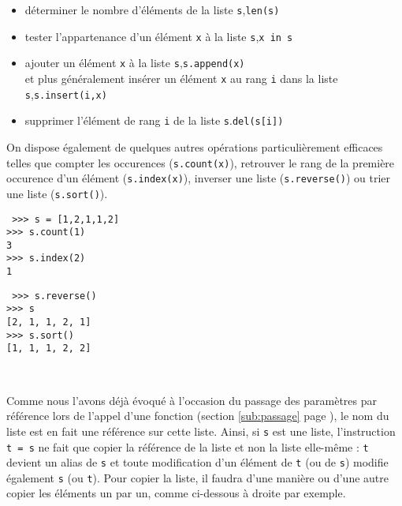 \begin{itemize}
\item déterminer le nombre d'éléments de la liste {\tt s},\hfill{\tt len(s)}
\item tester l'appartenance d'un élément {\tt x} à la liste {\tt s},\hfill{\tt x in s}
\item ajouter un élément {\tt x} à la liste {\tt s},\hfill{\tt s.append(x)}\\
	et plus généralement insérer un élément {\tt x} au rang {\tt i}
	dans la liste {\tt s},\hfill{\tt s.insert(i,x)}
\item supprimer l'élément de rang {\tt i} de la liste {\tt s}.\hfill{\tt del(s[i])}
\end{itemize}

On dispose également de quelques autres opérations particulièrement efficaces telles 
que compter les occurences ({\tt s.count(x)}), retrouver le rang de la première occurence
d'un élément ({\tt s.index(x)}), inverser une liste ({\tt s.reverse()}) ou trier une liste
({\tt s.sort()}).

\noindent\mbox{}\hspace*{1cm}\begin{py}{6.5cm}\tt
>>> s = [1,2,1,1,2]\\
>>> s.count(1)\\
3\\
>>> s.index(2)\\
1
\end{py}
\hfill
\begin{py}{6.5cm}\tt
>>> s.reverse()\\
>>> s\\
\mbox{}[2, 1, 1, 2, 1]\\
>>> s.sort()\\
\mbox{}[1, 1, 1, 2, 2]
\end{py}\\

\vspace*{2mm}

Comme nous l'avons déjà évoqué à l'occasion du passage des paramètres par référence
lors de l'appel d'une fonction (section \ref{sub:passage} page \pageref{sub:passage}), 
le nom du liste est en fait une référence sur cette liste. Ainsi, si {\tt s} est une liste,
l'instruction {\tt t = s} ne fait que copier la référence de la liste et non la liste
elle-même : {\tt t} devient un alias de {\tt s} et toute modification d'un élément de {\tt t}
(ou de {\tt s}) modifie également {\tt s} (ou {\tt t}). 
Pour copier la liste, il faudra d'une 
manière ou d'une autre copier les éléments un par un, comme 
ci-dessous à droite par exemple.

